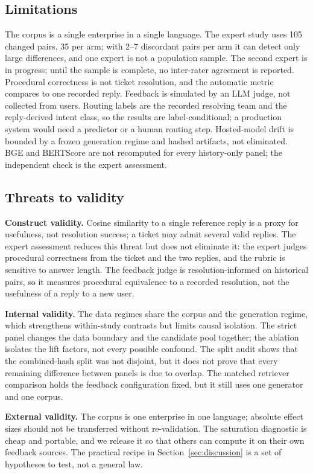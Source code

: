 \documentclass{ieeeaccess}
\begin{document}
\subsection{Limitations}
The corpus is a single enterprise in a single language. The expert study uses 105
changed pairs, 35 per arm; with 2--7 discordant pairs per arm it can detect only
large differences, and one expert is not a population sample. The second expert is
in progress; until the sample is complete, no inter-rater agreement is reported.
Procedural correctness is not ticket resolution, and the automatic metric compares
to one recorded reply. Feedback is simulated by an LLM judge, not collected from
users. Routing labels are the recorded resolving team and the reply-derived intent
class, so the results are label-conditional; a production system would need a
predictor or a human routing step. Hosted-model drift is bounded by a frozen
generation regime and hashed artifacts, not eliminated. BGE and BERTScore are not
recomputed for every history-only panel; the independent check is the expert
assessment.

\subsection{Threats to validity}
\textbf{Construct validity.} Cosine similarity to a single reference reply is a
proxy for usefulness, not resolution success; a ticket may admit several valid
replies. The expert assessment reduces this threat but does not eliminate it: the
expert judges procedural correctness from the ticket and the two replies, and the
rubric is sensitive to answer length. The feedback judge is resolution-informed on
historical pairs, so it measures procedural equivalence to a recorded resolution,
not the usefulness of a reply to a new user.

\textbf{Internal validity.} The data regimes share the corpus and the generation
regime, which strengthens within-study contrasts but limits causal isolation. The
strict panel changes the data boundary and the candidate pool together; the
ablation isolates the lift factors, not every possible confound. The split audit
shows that the combined-hash split was not disjoint, but it does not prove
that every remaining difference between panels is due to overlap. The matched
retriever comparison holds the feedback configuration fixed, but it still uses one
generator and one corpus.

\textbf{External validity.} The corpus is one enterprise in one language; absolute
effect sizes should not be transferred without re-validation. The saturation
diagnostic is cheap and portable, and we release it so that others can compute it
on their own feedback sources. The practical recipe in Section~\ref{sec:discussion}
is a set of hypotheses to test, not a general law.
\end{document}
